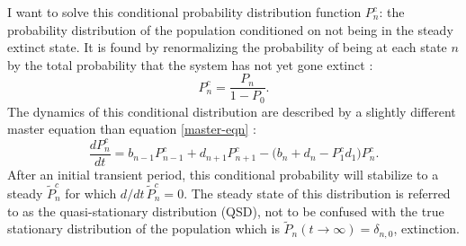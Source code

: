 I want to solve this conditional probability distribution function $P_n^c$: the probability distribution of the population conditioned on not being in the steady extinct state. 
It is found by renormalizing the probability of being at each state $n$ by the total probability that the system has not yet gone extinct \cite{Nisbet1982}:
\begin{equation*}
 P_n^c = \frac{P_n}{1-P_0}.
\end{equation*}
The dynamics of this conditional distribution are described by a slightly different master equation than equation \ref{master-eqn} \cite{Nisbet1982}:
\begin{equation}
\frac{dP_n^c}{dt} =  b_{n-1}P_{n-1}^c + d_{n+1}P_{n+1}^c - \big(b_n + d_n - P_1^c d_1 \big) P_n^c. 
\label{masters2}
\end{equation}
After an initial transient period, this conditional probability will stabilize to a steady $\tilde{P}^c_n$ for which $d/dt\,\tilde{P}_n^c=0$. 
The steady state of this distribution is referred to as the quasi-stationary distribution (QSD), not to be confused with the true stationary distribution of the population which is $\tilde{P}_n(t\rightarrow\infty)=\delta_{n,0}$, extinction. 


